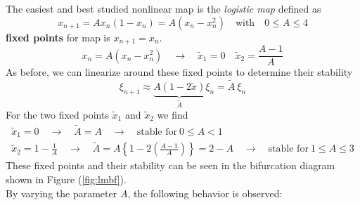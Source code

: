 The easiest and best studied nonlinear map is the \emph{logistic map} defined as
\begin{equation}
	x_{n+1}=Ax_n(1-x_n)=A(x_n-x_n^2)\quad\text{with}\quad0\leq A\leq4
\end{equation}
\textbf{fixed points} for map is $x_{n+1}=x_n$.
\begin{equation}
	x_n=A(x_n-x_n^2)\quad\rightarrow\quad\tilde{x}_1=0\quad\tilde{x}_2=\frac{A-1}{A}
\end{equation}
As before, we can linearize around these fixed points to determine their stability
\begin{equation*}
	\xi_{n+1}\approx\underbrace{A(1-2\tilde{x})}_{\tilde{A}}\xi_n=\tilde{A}\ \xi_n
\end{equation*}
For the two fixed points $\tilde{x}_1$ and $\tilde{x}_2$ we find
\begin{equation}
	\begin{aligned}
		\tilde{x}_1=0\quad\rightarrow\quad\tilde{A}=A\quad\rightarrow\quad\text{stable for}\ 0\leq A<1\\
		\tilde{x}_2=1-\frac{1}{A}\quad\rightarrow\quad\tilde{A}=A\left\{1-2\left(\frac{A-1}{A}\right)\right\}=2-A\quad\rightarrow\quad\text{stable for}\ 1\leq A\leq3
	\end{aligned}
\end{equation}
These fixed points and their stability can be seen in the bifurcation diagram shown in Figure (\ref{fig:lmbf}).\\
By varying the parameter $A$, the following behavior is observed:
